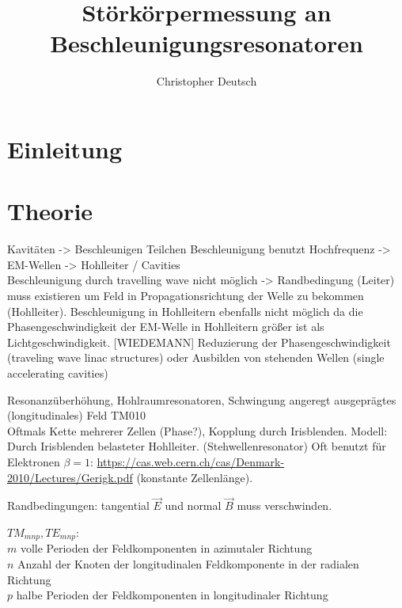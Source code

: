 \documentclass[11pt, a4paper]{scrbook}
\title{Störkörpermessung an Beschleunigungsresonatoren}
\author{Christopher Deutsch}
\newcommand{\ve}{\vec{E}}
\newcommand{\vb}{\vec{B}}
\begin{document}
	\frontmatter
	\maketitle
	\tableofcontents
	
	\mainmatter
	
	\chapter{Einleitung}
	
	
	\chapter{Theorie}
	Kavitäten -> Beschleunigen Teilchen
	Beschleunigung benutzt Hochfrequenz -> EM-Wellen -> Hohlleiter / Cavities\\
	Beschleunigung durch travelling wave nicht möglich -> Randbedingung (Leiter) muss existieren um Feld in Propagationsrichtung der Welle zu bekommen (Hohlleiter).
	Beschleunigung in Hohlleitern ebenfalls nicht möglich da die Phasengeschwindigkeit der EM-Welle in Hohlleitern größer ist als Lichtgeschwindigkeit.
	[WIEDEMANN] Reduzierung der Phasengeschwindigkeit (traveling wave linac structures) oder Ausbilden von stehenden Wellen (single accelerating cavities)
	
	Resonanzüberhöhung, Hohlraumresonatoren, Schwingung angeregt ausgeprägtes (longitudinales) Feld TM010\\
	Oftmals Kette mehrerer Zellen (Phase?), Kopplung durch Irisblenden.
	Modell: Durch Irisblenden belasteter Hohlleiter. (Stehwellenresonator)
	Oft benutzt für Elektronen $\beta = 1$: \url{https://cas.web.cern.ch/cas/Denmark-2010/Lectures/Gerigk.pdf}
	(konstante Zellenlänge).
	
	Randbedingungen: tangential $\ve$ und normal $\vb$ muss verschwinden.
	
	$TM_{mnp}, TE_{mnp}$:\\
	$m$ volle Perioden der Feldkomponenten in azimutaler Richtung\\
	$n$ Anzahl der Knoten der longitudinalen Feldkomponente in der radialen Richtung\\
	$p$ halbe Perioden der Feldkomponenten in longitudinaler Richtung
	
\end{document}
